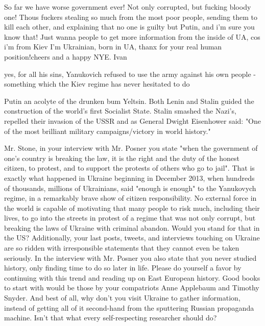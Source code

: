 \begin{itemize}
\begin{itemize}
\end{itemize} %


So far we have worse government ever! Not only corrupted, but fucking bloody
one! Thous fuckers stealing so much from the most poor people, sending them to
kill each other, and explaining that no one is guilty but Putin, and i'm sure
you know that! Just wanna people to get more information from the inside of UA,
cos i'm from Kiev I'm Ukrainian, born in UA, thanx for your real human
position!cheers and a happy NYE. Ivan

\begin{itemize} %

yes, for all his sins, Yanukovich refused to use the army against his own
people - something which the Kiev regime has never hesitated to do



Putin an acolyte of the drunken bum Yeltsin. Both Lenin and Stalin guided the
construction of the world's first Socialist State. Stalin smashed the Nazi's,
repelled their invasion of the USSR and as General Dwight Eisenhower said: "One
of the most brilliant military campaigns/victory in world history."

\end{itemize} %


Mr. Stone, in your interview with Mr. Posner you state "when the government of
one's country is breaking the law, it is the right and the duty of the honest
citizen, to protest, and to support the protests of others who go to jail".
That is exactly what happened in Ukraine beginning in December 2013, when
hundreds of thousands, millions of Ukrainians, said "enough is enough" to the
Yanukovych regime, in a remarkably brave show of citizen responsibility. No
external force in the world is capable of motivating that many people to risk
much, including their lives, to go into the streets in protest of a regime that
was not only corrupt, but breaking the laws of Ukraine with criminal abandon.
Would you stand for that in the US? Additionally, your last posts, tweets, and
interviews touching on Ukraine are so ridden with irresponsible statements that
they cannot even be taken seriously. In the interview with Mr. Posner you also
state that you never studied history, only finding time to do so later in life.
Please do yourself a favor by continuing with this trend and reading up on East
European history. Good books to start with would be those by your compatriots
Anne Applebaum and Timothy Snyder. And best of all, why don't you visit Ukraine
to gather information, instead of getting all of it second-hand from the
sputtering Russian propaganda machine. Isn't that what every self-respecting
researcher should do?

\end{itemize} %

